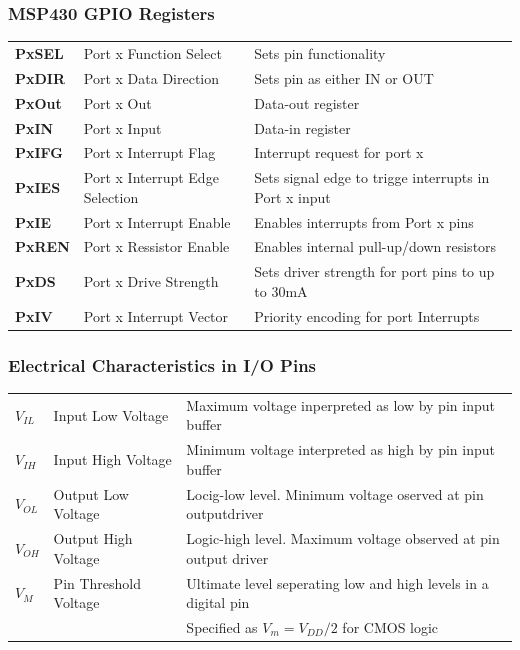 \subsubsection{MSP430 GPIO Registers }
\begin{tabular}{>{\bfseries}lll}
	PxSEL   &Port x Function Select             & Sets pin functionality  \\ 
	PxDIR   &Port x Data Direction              & Sets pin as either IN or OUT \\ 
	PxOut   &Port x Out                         & Data-out register \\ 
	PxIN    &Port x Input                       & Data-in register  \\ 
	PxIFG   &Port x Interrupt Flag              & Interrupt request for port x \\ 
	PxIES   &Port x Interrupt Edge Selection    & Sets signal edge to trigge interrupts in Port x input  \\ 
	PxIE    &Port x Interrupt Enable            & Enables interrupts from Port x pins \\ 
	PxREN   &Port x Ressistor Enable            & Enables internal pull-up/down resistors \\ 
	PxDS    &Port x Drive Strength              & Sets driver strength for port pins to up to 30mA  \\ 
	PxIV    &Port x Interrupt Vector            & Priority encoding for port Interrupts \\ 
\end{tabular} 

\subsubsection{Electrical Characteristics in I/O Pins }
\begin{tabular}{lll}
	$ V_{IL} $& Input Low Voltage&Maximum voltage inperpreted as low by pin input buffer\\
	$ V_{IH} $& Input High Voltage& Minimum voltage interpreted as high by pin input buffer\\
	$ V_{OL} $& Output Low Voltage& Locig-low level. Minimum voltage oserved at pin outputdriver\\
	$ V_{OH} $& Output High Voltage& Logic-high level. Maximum voltage observed at pin output driver\\
	$ V_M $   & Pin Threshold Voltage& Ultimate level seperating low and high levels in a digital pin\\
	&                      & Specified as $ V_m=V_{DD}/2 $ for CMOS logic\\
\end{tabular} 
\clearpage

